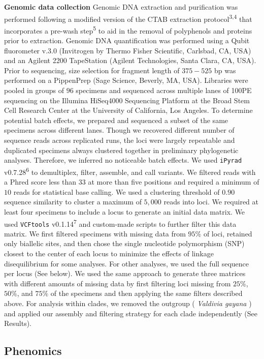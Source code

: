 \documentclass[
  11pt,
]{article}
\begin{document}
\textbf{Genomic data collection} Genomic DNA extraction and purification was performed following a modified version of the CTAB extraction protocol\textsuperscript{3,4} that incorporates a pre-wash step\textsuperscript{5} to aid in the removal of polyphenols and proteins prior to extraction. Genomic DNA quantification was performed using a Qubit fluorometer v.3.0 (Invitrogen by Thermo Fisher Scientific, Carlsbad, CA, USA) and an Agilent 2200 TapeStation (Agilent Technologies, Santa Clara, CA, USA). Prior to sequencing, size selection for fragment length of \(375-525\) bp was performed on a PippenPrep (Sage Science, Beverly, MA, USA). Libraries were pooled in groups of \(96\) specimens and sequenced across multiple lanes of 100PE sequencing on the Illumina HiSeq4000 Sequencing Platform at the Broad Stem Cell Research Center at the University of California, Los Angeles. To determine potential batch effects, we prepared and sequenced a subset of the same specimens across different lanes. Though we recovered different number of sequence reads across replicated runs, the loci were largely repeatable and duplicated specimens always clustered together in preliminary phylogenetic analyses. Therefore, we inferred no noticeable batch effects. We used \texttt{iPyrad} v0.7.28\textsuperscript{6} to demultiplex, filter, assemble, and call variants. We filtered reads with a Phred score less than \(33\) at more than five positions and required a minimum of \(10\) reads for statistical base calling. We used a clustering threshold of \(0.90\) sequence similarity to cluster a maximum of \(5,000\) reads into loci. We required at least four specimens to include a locus to generate an initial data matrix. We used \texttt{VCFtools} v0.1.14\textsuperscript{7} and custom-made scripts to further filter this data matrix. We first filtered specimens with missing data from \(95\%\) of loci, retained only biallelic sites, and then chose the single nucleotide polymorphism (SNP) closest to the center of each locus to minimize the effects of linkage disequilibrium for some analyses. For other analyses, we used the full sequence per locus (See below). We used the same approach to generate three matrices with different amounts of missing data by first filtering loci missing from \(25\%\), \(50\%\), and \(75\%\) of the specimens and then applying the same filters described above. For analysis within clades, we removed the outgroup ( \emph{Valdivia gayana} ) and applied our assembly and filtering strategy for each clade independently (See Results).

\hypertarget{phenomics}{%
\subsection{Phenomics}\label{phenomics}}
\end{document}
